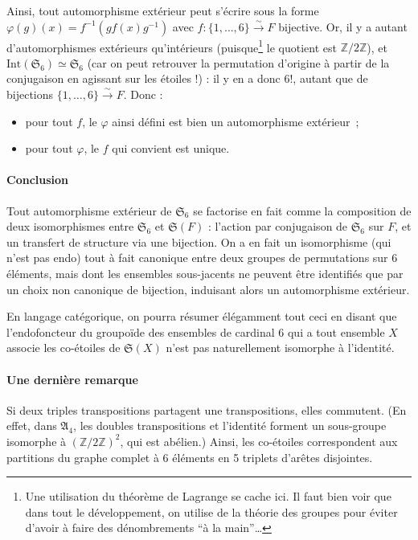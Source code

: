 \documentclass[a4paper, 11pt]{article}
\def\Z{\mathbb{Z}}
\def\Sigmap{\mathfrak{S}}
\begin{document}
Ainsi, tout automorphisme extérieur peut s'écrire sous la forme $\varphi(g)(x) =
f^{-1}(gf(x)g^{-1})$ avec $f : \{1, \ldots, 6\} \xrightarrow{\sim} F$ bijective.
Or, il y a autant d'automorphismes extérieurs qu'intérieurs
(puisque\footnote{Une utilisation du théorème de Lagrange se cache ici. Il faut
  bien voir que dans tout le développement, on utilise de la théorie des groupes
  pour éviter d'avoir à faire des dénombrements \enquote{à la main}…} le
quotient est $\Z/2\Z$), et $\mathrm{Int}(\Sigmap_6) \simeq \Sigmap_6$ (car on
peut retrouver la permutation d'origine à partir de la conjugaison en agissant
sur les étoiles !) : il y en a donc $6!$, autant que de bijections $\{1, \ldots,
6\} \xrightarrow{\sim} F$. Donc :
\begin{itemize}
\item pour tout $f$, le $\varphi$ ainsi défini est bien un automorphisme
  extérieur~;
\item pour tout $\varphi$, le $f$ qui convient est unique.
\end{itemize}

\paragraph{Conclusion} Tout automorphisme extérieur de $\Sigmap_6$ se factorise
en fait comme la composition de deux isomorphismes entre $\Sigmap_6$ et
$\Sigmap(F)$ : l'action par conjugaison de $\Sigmap_6$ sur $F$, et un transfert
de structure via une bijection. On a en fait un isomorphisme (qui n'est pas
endo) tout à fait canonique entre deux groupes de permutations sur 6 éléments,
mais dont les ensembles sous-jacents ne peuvent être identifiés que par un choix
non canonique de bijection, induisant alors un automorphisme extérieur.

En langage catégorique, on pourra résumer élégamment tout ceci en disant que
l'endofoncteur du groupoïde des ensembles de cardinal 6 qui a tout ensemble $X$
associe les co-étoiles de $\Sigmap(X)$ n'est pas naturellement isomorphe à
l'identité.


\paragraph{Une dernière remarque} Si deux triples transpositions partagent une
transpositions, elles commutent. (En effet, dans $\mathfrak{A}_4$, les doubles
transpositions et l'identité forment un sous-groupe isomorphe à $(\Z/2\Z)^2$,
qui est abélien.) Ainsi, les co-étoiles correspondent aux partitions du graphe
complet à 6 éléments en 5 triplets d'arêtes disjointes.
\end{document}
